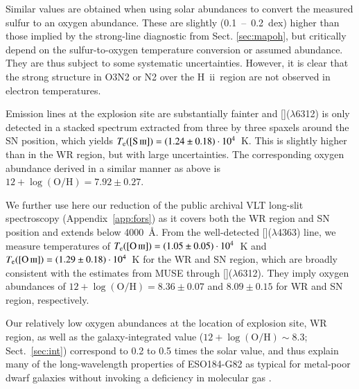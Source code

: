 \documentclass[traditabstract]{aa}
\newcommand{\hii}{\mbox{H~{\sc ii}}}
\newcommand{\oh}{12+\log(\mathrm{O/H})}
\newcommand{\siii}{[\ion{S}{iii}]}
\newcommand{\oiii}{[\ion{O}{iii}]}
\begin{document}
Similar values are obtained when using solar abundances to convert the measured sulfur to an oxygen abundance. These are slightly (0.1~--~0.2~dex) higher than those implied by the strong-line diagnostic from Sect. \ref{sec:mapoh}, but critically depend on the sulfur-to-oxygen temperature conversion or assumed abundance. They are thus subject to some systematic uncertainties. However, it is clear that the strong structure in O3N2 or N2 over the \hii\  region are not observed in electron temperatures.

Emission lines at the explosion site are substantially fainter and \siii($\lambda$6312) is only detected in a stacked spectrum extracted from three by three spaxels around the SN position, which yields $T_{\mathrm{e}}(\siii)=(1.24\pm0.18)\cdot10^{4}$~K. This is slightly higher than in the WR region, but with large uncertainties. The corresponding oxygen abundance derived in a similar manner as above is $\oh=7.92\pm0.27$.

We further use here our reduction of the public archival VLT long-slit spectroscopy (Appendix~\ref{app:fors}) as it covers both the WR region and SN position and extends below 4000~\AA. From the well-detected \oiii($\lambda$4363) line, we measure temperatures of $T_{\mathrm{e}}(\oiii)=(1.05\pm0.05)\cdot 10^{4}$~K and $T_{\mathrm{e}}(\oiii)=(1.29\pm0.18)\cdot10^{4}$~K for the WR and SN region, which are broadly consistent with the estimates from MUSE through \siii($\lambda$6312). They imply oxygen abundances of $\oh=8.36\pm0.07$ and $8.09\pm0.15$ for WR and SN region, respectively.

Our relatively low oxygen abundances at the location of explosion site, WR region, as well as the galaxy-integrated value ($\oh\sim8.3$; Sect.~\ref{sec:int}) correspond to 0.2 to 0.5 times the solar value, and thus explain many of the long-wavelength properties of ESO184-G82 as typical for metal-poor dwarf galaxies without invoking a deficiency in molecular gas \citep{2016arXiv160901742M}.
\end{document}
